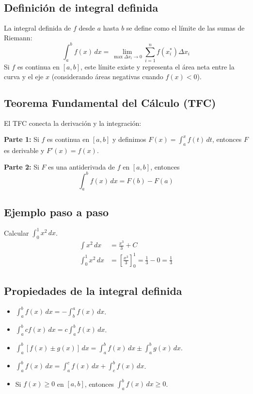 \documentclass[12pt,a4paper,openany,oneside]{book}
\begin{document}
\subsection{Definición de integral definida}
La integral definida de $f$ desde $a$ hasta $b$ se define como el límite de las sumas de Riemann:
\[
\int_a^b f(x) \, dx = \lim_{\max \Delta x_i \to 0} \sum_{i=1}^n f(x_i^*) \Delta x_i
\]
Si $f$ es continua en $[a,b]$, este límite existe y representa el área neta entre la curva y el eje $x$ (considerando áreas negativas cuando $f(x) < 0$).

\subsection{Teorema Fundamental del Cálculo (TFC)}
El TFC conecta la derivación y la integración:

\textbf{Parte 1:} Si $f$ es continua en $[a,b]$ y definimos $F(x) = \int_a^x f(t) \, dt$, entonces $F$ es derivable y $F'(x) = f(x)$.

\textbf{Parte 2:} Si $F$ es una antiderivada de $f$ en $[a,b]$, entonces
\[
\int_a^b f(x) \, dx = F(b) - F(a)
\]

\subsection{Ejemplo paso a paso}
Calcular $\int_0^1 x^2 \, dx$.
\begin{align*}
\int x^2 \, dx &= \frac{x^3}{3} + C \\
\int_0^1 x^2 \, dx &= \left[ \frac{x^3}{3} \right]_0^1 = \frac{1}{3} - 0 = \frac{1}{3}
\end{align*}

\subsection{Propiedades de la integral definida}
\begin{itemize}
    \item $\int_a^b f(x) \, dx = -\int_b^a f(x) \, dx$.
    \item $\int_a^b c f(x) \, dx = c \int_a^b f(x) \, dx$.
    \item $\int_a^b [f(x) \pm g(x)] \, dx = \int_a^b f(x) \, dx \pm \int_a^b g(x) \, dx$.
    \item $\int_a^b f(x) \, dx = \int_a^c f(x) \, dx + \int_c^b f(x) \, dx$.
    \item Si $f(x) \ge 0$ en $[a,b]$, entonces $\int_a^b f(x) \, dx \ge 0$.
\end{itemize}
\end{document}
